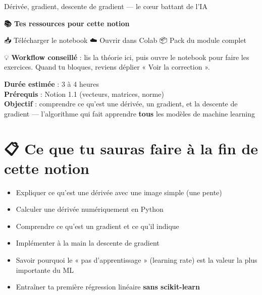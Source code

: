 \documentclass[
  french,
  11pt,
  a4paper,
]{scrbook}
\providecommand{\tightlist}{%
  \setlength{\itemsep}{0pt}\setlength{\parskip}{0pt}}
\begin{document}
Dérivée, gradient, descente de gradient --- le cœur battant de l'IA

\hfill\break

\begin{tcolorbox}[enhanced jigsaw, arc=.35mm, bottomrule=.15mm, breakable, colback=white, colframe=quarto-callout-note-color-frame, left=2mm, leftrule=.75mm, opacityback=0, rightrule=.15mm, toprule=.15mm]

\vspace{-3mm}\textbf{📚 Tes ressources pour cette notion}\vspace{3mm}

📥 Télécharger le notebook ☁️ Ouvrir dans Colab 📦 Pack du module
complet

💡 \textbf{Workflow conseillé} : lis la théorie ici, puis ouvre le
notebook pour faire les exercices. Quand tu bloques, reviens déplier «
Voir la correction ».

\end{tcolorbox}

\begin{tcolorbox}[enhanced jigsaw, arc=.35mm, bottomrule=.15mm, breakable, colback=white, colframe=quarto-callout-note-color-frame, left=2mm, leftrule=.75mm, opacityback=0, rightrule=.15mm, toprule=.15mm]
\begin{minipage}[t]{5.5mm}
\textcolor{quarto-callout-note-color}{\faInfo}
\end{minipage}%
\begin{minipage}[t]{\textwidth - 5.5mm}

\textbf{Durée estimée} : 3 à 4 heures\\
\textbf{Prérequis} : Notion 1.1 (vecteurs, matrices, norme)\\
\textbf{Objectif} : comprendre ce qu'est une dérivée, un gradient, et la
descente de gradient --- l'algorithme qui fait apprendre \textbf{tous}
les modèles de machine learning

\end{minipage}%
\end{tcolorbox}

\section{📋 Ce que tu sauras faire à la fin de cette
notion}\label{ce-que-tu-sauras-faire-uxe0-la-fin-de-cette-notion-1}

\begin{itemize}
\tightlist
\item
  Expliquer ce qu'est une dérivée avec une image simple (une pente)
\item
  Calculer une dérivée numériquement en Python
\item
  Comprendre ce qu'est un gradient et ce qu'il indique
\item
  Implémenter à la main la descente de gradient
\item
  Savoir pourquoi le « pas d'apprentissage » (learning rate) est la
  valeur la plus importante du ML
\item
  Entraîner ta première régression linéaire \textbf{sans scikit-learn}
\end{itemize}
\end{document}
